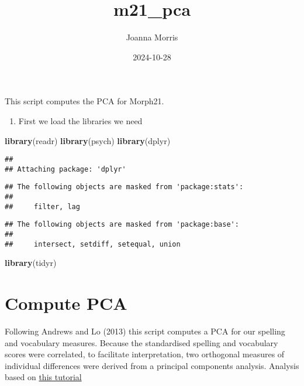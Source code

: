 \documentclass[
]{article}
\title{m21\_pca}
\author{Joanna Morris}
\date{2024-10-28}
\newenvironment{Shaded}{\begin{snugshade}}{\end{snugshade}}
\newcommand{\FunctionTok}[1]{\textcolor[rgb]{0.13,0.29,0.53}{\textbf{#1}}}
\newcommand{\NormalTok}[1]{#1}
\providecommand{\tightlist}{%
  \setlength{\itemsep}{0pt}\setlength{\parskip}{0pt}}
\begin{document}
\maketitle

This script computes the PCA for Morph21.

\begin{enumerate}
\def\labelenumi{\arabic{enumi}.}
\tightlist
\item
  First we load the libraries we need
\end{enumerate}

\begin{Shaded}
\begin{Highlighting}[]
\FunctionTok{library}\NormalTok{(readr)}
\FunctionTok{library}\NormalTok{(psych)}
\FunctionTok{library}\NormalTok{(dplyr)}
\end{Highlighting}
\end{Shaded}

\begin{verbatim}
## 
## Attaching package: 'dplyr'
\end{verbatim}

\begin{verbatim}
## The following objects are masked from 'package:stats':
## 
##     filter, lag
\end{verbatim}

\begin{verbatim}
## The following objects are masked from 'package:base':
## 
##     intersect, setdiff, setequal, union
\end{verbatim}

\begin{Shaded}
\begin{Highlighting}[]
\FunctionTok{library}\NormalTok{(tidyr)}
\end{Highlighting}
\end{Shaded}

\section{Compute PCA}\label{compute-pca}

Following Andrews and Lo (2013) this script computes a PCA for our
spelling and vocabulary measures. Because the standardised spelling and
vocabulary scores were correlated, to facilitate interpretation, two
orthogonal measures of individual differences were derived from a
principal components analysis. Analysis based on
\href{http://www.sthda.com/english/articles/31-principal-component-methods-in-r-practical-guide/112-pca-principal-component-analysis-essentials/}{this
tutorial}
\end{document}
